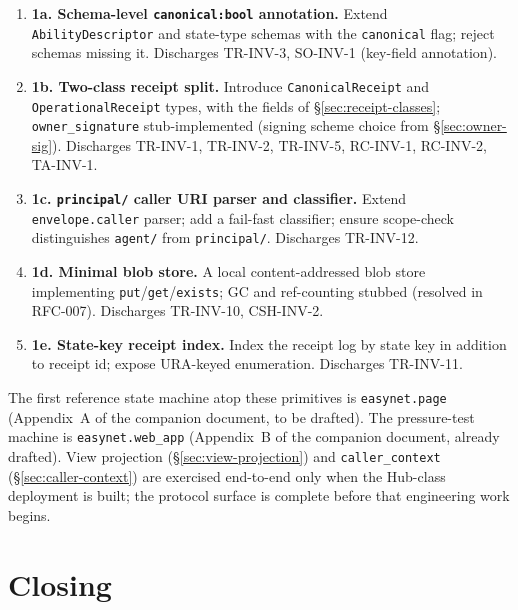 \documentclass[11pt,a4paper]{article}
\theoremstyle{definition}
\begin{document}
\begin{enumerate}[leftmargin=2.5em,itemsep=0.3em]
    \item \textbf{1a. Schema-level \texttt{canonical:bool}
    annotation.} Extend \texttt{AbilityDescriptor} and state-type
    schemas with the \texttt{canonical} flag; reject schemas
    missing it. Discharges TR-INV-3, SO-INV-1 (key-field
    annotation).

    \item \textbf{1b. Two-class receipt split.} Introduce
    \texttt{CanonicalReceipt} and \texttt{OperationalReceipt}
    types, with the fields of \S\ref{sec:receipt-classes};
    \texttt{owner\_signature} stub-implemented (signing scheme
    choice from \S\ref{sec:owner-sig}). Discharges TR-INV-1,
    TR-INV-2, TR-INV-5, RC-INV-1, RC-INV-2, TA-INV-1.

    \item \textbf{1c. \texttt{principal/} caller URI parser and
    classifier.} Extend \texttt{envelope.caller} parser; add a
    fail-fast classifier; ensure scope-check distinguishes
    \texttt{agent/} from \texttt{principal/}. Discharges TR-INV-12.

    \item \textbf{1d. Minimal blob store.} A local content-addressed
    blob store implementing \texttt{put}/\texttt{get}/\texttt{exists};
    GC and ref-counting stubbed (resolved in RFC-007). Discharges
    TR-INV-10, CSH-INV-2.

    \item \textbf{1e. State-key receipt index.} Index the receipt
    log by state key in addition to receipt id; expose URA-keyed
    enumeration. Discharges TR-INV-11.
\end{enumerate}

The first reference state machine atop these primitives is
\texttt{easynet.page} (Appendix~A of the companion document, to be
drafted). The pressure-test machine is \texttt{easynet.web\_app}
(Appendix~B of the companion document, already drafted). View
projection (\S\ref{sec:view-projection}) and
\texttt{caller\_context} (\S\ref{sec:caller-context}) are exercised
end-to-end only when the Hub-class deployment is built; the
protocol surface is complete before that engineering work begins.

\section{Closing}
\label{sec:closing}
\end{document}
